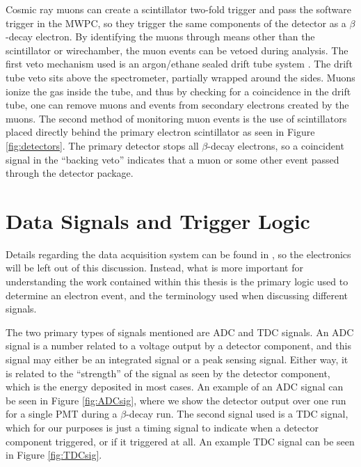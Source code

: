 Cosmic ray muons can create a scintillator two-fold trigger and pass the software trigger in
the MWPC, so they trigger the same components of the detector as a $\beta$-decay electron. By identifying
the muons through means other than the scintillator or wirechamber, the muon events
can be vetoed during analysis. The first veto mechanism used
is an argon/ethane sealed drift tube system \cite{rios2011sealed}. The drift tube veto sits
above the spectrometer, partially wrapped around the sides. Muons ionize the gas inside the
tube, and thus by checking for a coincidence in the drift tube, one can remove muons
and events from secondary electrons created by the muons. The second method of monitoring
muon events is the use of scintillators placed directly behind the primary
electron scintillator as seen in Figure \ref{fig:detectors}. The primary detector
stops all $\beta$-decay electrons, so a coincident signal in the ``backing veto''
indicates that a muon or some other event passed through the detector package.

\section{Data Signals and Trigger Logic}

Details regarding the data acquisition system can be found in \cite{plaster2012,mpmThesis},
so the electronics will be left out of this discussion. Instead, what is more important for
understanding the work contained within this thesis is the primary logic used to
determine an electron event, and the terminology used when discussing different signals.

The two primary types of signals mentioned are ADC and TDC signals.
An ADC signal is a number related to a voltage output by a detector component, and this
signal may either be an integrated signal or a peak sensing signal. Either way, it is related
to the ``strength'' of the signal as seen by the detector component, which is the energy deposited
in most cases. An example of an ADC signal can be seen in Figure \ref{fig:ADCsig}, where we show the
detector output over one run for a single PMT during a $\beta$-decay run.
The second signal used is a TDC signal, which for our purposes is
just a timing signal to indicate when a detector component triggered, or if it triggered at all.
An example TDC signal can be
seen in Figure \ref{fig:TDCsig}.

